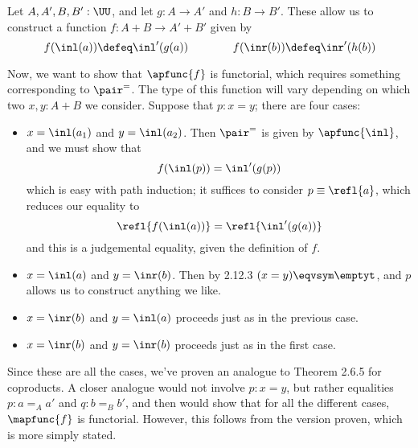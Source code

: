  \soln
Let $A, A', B, B' : \UU$, and let $g: A \to A'$ and $h: B \to B'$.  These allow
us to construct a function $f : A + B \to A' + B'$ given by
\[
  f(\inl(a)) \defeq \inl'(g(a))
  \qquad\qquad
  f(\inr(b)) \defeq \inr'(h(b))
\]


Now, we want to show that $\apfunc{f}$ is functorial, which requires something
corresponding to $\pair^{=}$.  The type of this function will vary depending on
which two $x, y : A+B$ we consider. Suppose that $p : x = y$; there are four
cases:



\begin{itemize}
\item  $x = \inl(a_{1})$ and $y = \inl(a_{2})$.  Then $\pair^{=}$ is given by
  $\apfunc{\inl}$, and we must show that
  \[
    f(\inl(p)) = \inl'(g(p))
  \]
  which is easy with path induction; it suffices to consider $p \equiv
  \refl{a}$, which reduces our equality to
  \[
    \refl{f(\inl(a))} = \refl{\inl'(g(a))}
  \]
  and this is a judgemental equality, given the definition of $f$.



\item  $x = \inl(a)$ and $y = \inr(b)$.  Then by 2.12.3 $(x = y) \eqvsym \emptyt$,
  and $p$ allows us to construct anything we like.



\item  $x = \inr(b)$ and $y = \inl(a)$ proceeds just as in the previous case.



\item  $x = \inr(b)$ and $y = \inr(b)$ proceeds just as in the first case.

\end{itemize}
Since these are all the cases, we've proven an analogue to Theorem 2.6.5 for
coproducts.  A closer analogue would not involve $p : x = y$, but rather
equalities $p : a =_{A} a'$ and $q : b =_{B} b'$, and then would show that for
all the different cases, $\mapfunc{f}$ is functorial.  However, this follows
from the version proven, which is more simply stated.
